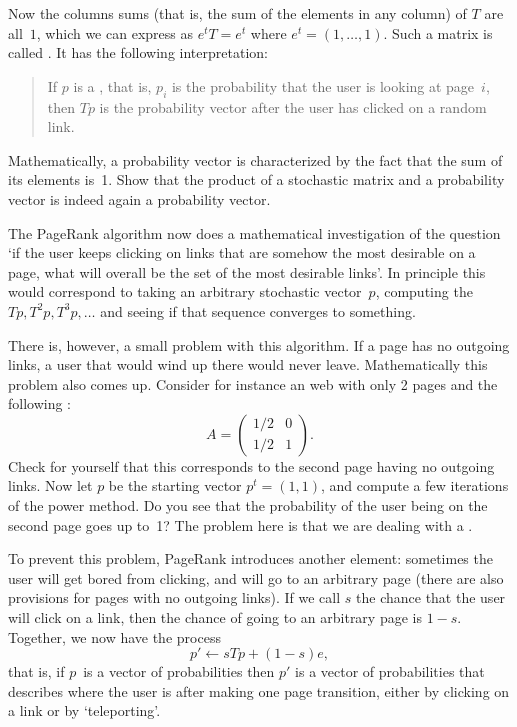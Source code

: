 Now the columns sums (that is, the sum of the elements in any column)
of $T$ are all~$1$, which we can express as $e^tT=e^t$ where
$e^t=(1,\ldots,1)$. Such a matrix is
called . It has the following
interpretation:
\begin{quote}
  If $p$ is a , that is, $p_i$ is the
  probability that the user is looking at page~$i$, then $Tp$ is the
  probability vector after the user has clicked on a random link.
\end{quote}

\begin{exercise}
  Mathematically, a probability vector is characterized by the fact
  that the sum of its elements is~1. Show that the product of a
  stochastic matrix and a probability vector is indeed again a
  probability vector.
\end{exercise}

The PageRank algorithm now does a mathematical investigation of the
question `if the user keeps clicking on links that are somehow the
most desirable on a page, what will overall be the set of the most
desirable links'. In principle this would correspond to taking an
arbitrary stochastic vector~$p$, computing the 
$Tp,T^2p,T^3p,\ldots$ and
seeing if that sequence converges to something.

There is, however, a small problem with this algorithm. If a page has
no outgoing links, a user that would wind up there would never
leave. Mathematically this problem also comes up. Consider for
instance an web with only 2 pages and the following
:
\[ A=
\begin{pmatrix}
  1/2&0\\ 1/2&1
\end{pmatrix}.
\]
Check for yourself that this corresponds to the second page having no
outgoing links. Now let $p$ be the starting vector $p^t=(1,1)$, and
compute a few iterations of the power method. Do you see that the
probability of the user being on the second page goes up to~1? The
problem here is that we are dealing with a
.

To prevent this problem, PageRank
introduces another element: sometimes the user
will get bored from clicking, and will go to an arbitrary page (there
are also provisions for pages with no outgoing links). If we
call $s$ the chance that the user will click on a link, then the
chance of going to an arbitrary page is $1-s$. Together, we now have
the process
\[ p'\leftarrow sTp+(1-s)e, \]
that is, if $p$~is a vector of probabilities then $p'$ is a vector of
probabilities that describes where the user is after making one page
transition, either by clicking on a link or by `teleporting'.

